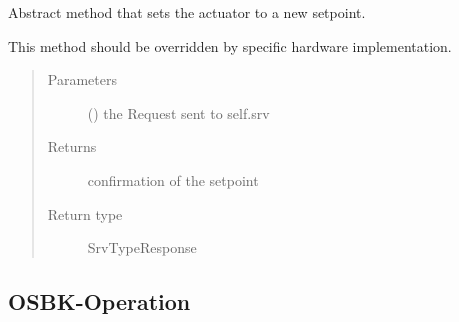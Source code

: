 \documentclass[a4paper,12pt,twoside]{article}
\begin{document}
\begin{fulllineitems}
\begin{fulllineitems}
\end{fulllineitems}


\begin{fulllineitems}
\label{\detokenize{osbk_devices:osbk_devices.actuator_base.ActuatorBase.set_actuator}}
Abstract method that sets the actuator to a new setpoint.

This method should be overridden by specific hardware implementation.
\begin{quote}\begin{description}
\item[{Parameters}] \leavevmode
{} () \textendash{} the Request sent to self.srv

\item[{Returns}] \leavevmode
confirmation of the setpoint

\item[{Return type}] \leavevmode
SrvTypeResponse

\end{description}\end{quote}

\end{fulllineitems}


\end{fulllineitems}


\clearpage
\subsection{OSBK-Operation}
\label{\detokenize{osbk_operation:module-osbk_operation.actuator_state_machine}}\label{\detokenize{osbk_operation:osbk-operation}}\label{\detokenize{osbk_operation::doc}}
\end{document}
